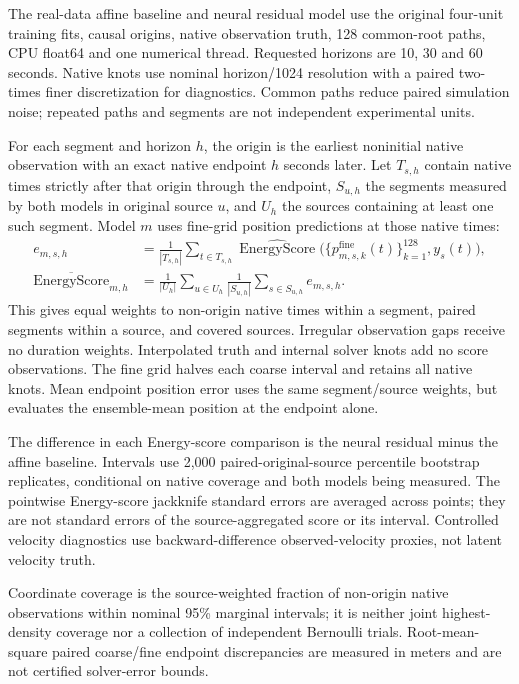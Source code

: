 \documentclass[11pt]{article}
\begin{document}
The real-data affine baseline and neural residual model use the original four-unit training fits, causal origins, native observation truth, 128 common-root paths, CPU float64 and one numerical thread. Requested horizons are 10, 30 and 60 seconds. Native knots use nominal horizon/1024 resolution with a paired two-times finer discretization for diagnostics. Common paths reduce paired simulation noise; repeated paths and segments are not independent experimental units.

For each segment and horizon $h$, the origin is the earliest noninitial native observation with an exact native endpoint $h$ seconds later. Let $T_{s,h}$ contain native times strictly after that origin through the endpoint, $S_{u,h}$ the segments measured by both models in original source $u$, and $U_h$ the sources containing at least one such segment. Model $m$ uses fine-grid position predictions at those native times:
\begin{equation}\label{eq:real-score}
\begin{aligned}
 e_{m,s,h}&=\frac{1}{|T_{s,h}|}\sum_{t\in T_{s,h}}
 \widehat{\operatorname{EnergyScore}}\bigl(\{p^{\mathrm{fine}}_{m,s,k}(t)\}_{k=1}^{128},y_s(t)\bigr),\\
 \overline{\operatorname{EnergyScore}}_{m,h}&=\frac{1}{|U_h|}\sum_{u\in U_h}
 \frac{1}{|S_{u,h}|}\sum_{s\in S_{u,h}} e_{m,s,h}.
\end{aligned}
\end{equation}
This gives equal weights to non-origin native times within a segment, paired segments within a source, and covered sources. Irregular observation gaps receive no duration weights. Interpolated truth and internal solver knots add no score observations. The fine grid halves each coarse interval and retains all native knots. Mean endpoint position error uses the same segment/source weights, but evaluates the ensemble-mean position at the endpoint alone.

The difference in each Energy-score comparison is the neural residual minus the affine baseline. Intervals use 2,000 paired-original-source percentile bootstrap replicates, conditional on native coverage and both models being measured. The pointwise Energy-score jackknife standard errors are averaged across points; they are not standard errors of the source-aggregated score or its interval. Controlled velocity diagnostics use backward-difference observed-velocity proxies, not latent velocity truth.

Coordinate coverage is the source-weighted fraction of non-origin native observations within nominal 95\% marginal intervals; it is neither joint highest-density coverage nor a collection of independent Bernoulli trials. Root-mean-square paired coarse/fine endpoint discrepancies are measured in meters and are not certified solver-error bounds.
\end{document}
